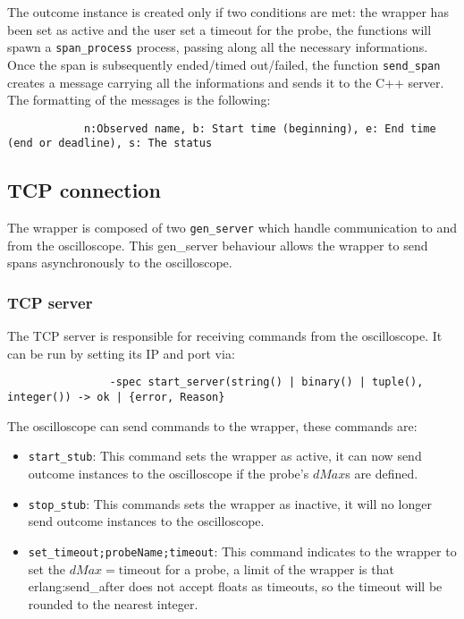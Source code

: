             The outcome instance is created only if two conditions are met: the wrapper has been set as active and the user set a timeout for the probe, the functions will spawn a \texttt{span\_process} process, passing along all the necessary informations. \\
        Once the span is subsequently ended/timed out/failed, the function \texttt{send\_span} creates a message carrying all the informations and sends it to the C++ server. The formatting of the messages is the following:
        \begin{verbatim}
            n:Observed name, b: Start time (beginning), e: End time (end or deadline), s: The status
        \end{verbatim}

    \subsection{TCP connection}
        The wrapper is composed of two \texttt{gen\_server} which handle communication to and from the oscilloscope. This gen\_server behaviour allows the wrapper to send spans asynchronously to the oscilloscope.

        \subsubsection{TCP server}
            The TCP server is responsible for receiving commands from the oscilloscope. It can be run by setting its IP and port via:
            \begin{verbatim}
                -spec start_server(string() | binary() | tuple(), integer()) -> ok | {error, Reason}
            \end{verbatim}
            The oscilloscope can send commands to the wrapper, these commands are:
            \begin{itemize}
                \item \texttt{start\_stub}: This command sets the wrapper as active, it can now send outcome instances to the oscilloscope if the probe's $dMax$s are defined.
                \item \texttt{stop\_stub}: This commands sets the wrapper as inactive, it will no longer send outcome instances to the oscilloscope.
                \item \texttt{set\_timeout;probeName;timeout}: This command indicates to the wrapper to set the $dMax = \text{timeout}$ for a probe, a limit of the wrapper is that erlang:send\_after does not accept floats as timeouts, so the timeout will be rounded to the nearest integer.
            \end{itemize}

